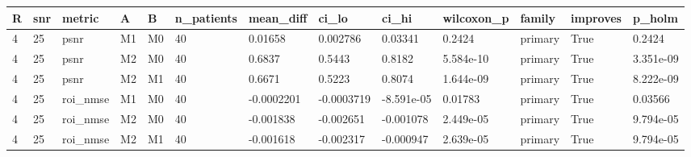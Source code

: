 \begin{tabular}{lllllllllllll}
\hline
R & snr & metric & A & B & n\_patients & mean\_diff & ci\_lo & ci\_hi & wilcoxon\_p & family & improves & p\_holm \\
\hline
4 & 25 & psnr & M1 & M0 & 40 & 0.01658 & 0.002786 & 0.03341 & 0.2424 & primary & True & 0.2424 \\
4 & 25 & psnr & M2 & M0 & 40 & 0.6837 & 0.5443 & 0.8182 & 5.584e-10 & primary & True & 3.351e-09 \\
4 & 25 & psnr & M2 & M1 & 40 & 0.6671 & 0.5223 & 0.8074 & 1.644e-09 & primary & True & 8.222e-09 \\
4 & 25 & roi\_nmse & M1 & M0 & 40 & -0.0002201 & -0.0003719 & -8.591e-05 & 0.01783 & primary & True & 0.03566 \\
4 & 25 & roi\_nmse & M2 & M0 & 40 & -0.001838 & -0.002651 & -0.001078 & 2.449e-05 & primary & True & 9.794e-05 \\
4 & 25 & roi\_nmse & M2 & M1 & 40 & -0.001618 & -0.002317 & -0.000947 & 2.639e-05 & primary & True & 9.794e-05 \\
\hline
\end{tabular}
